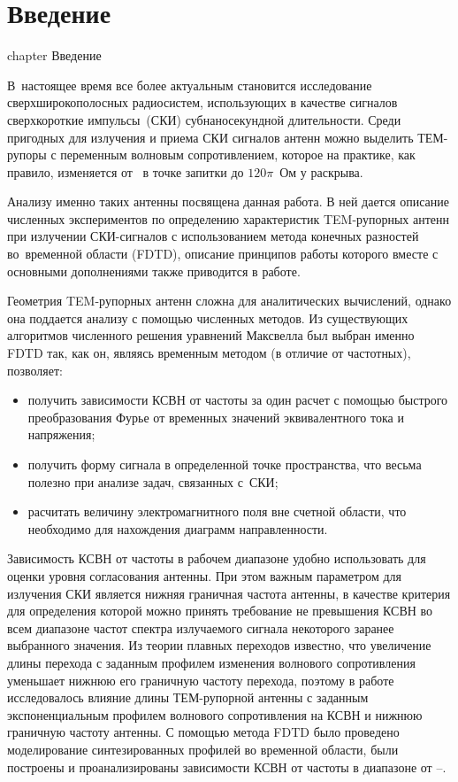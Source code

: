 %
%
%
\chapter* {Введение}
 {chapter} {Введение}

В~настоящее время все более актуальным становится исследование
сверхширокополосных радиосистем, использующих в качестве сигналов сверхкороткие
импульсы~(СКИ) субнаносекундной длительности. Среди пригодных для излучения
и приема СКИ сигналов антенн можно выделить ТЕМ-рупоры с переменным волновым
сопротивлением, которое на практике, как правило, изменяется от~
в точке запитки до $120\pi$~Ом у раскрыва.

Анализу именно таких антенны посвящена данная работа. В ней дается описание
численных экспериментов по определению характеристик TEM-рупорных
антенн при излучении СКИ-сигналов с использованием метода конечных разностей
во~временной области (FDTD), описание принципов работы которого вместе
с основными дополнениями также приводится в работе.

Геометрия TEM-рупорных антенн сложна для аналитических вычислений, однако она
поддается анализу с помощью численных методов. Из существующих алгоритмов
численного решения уравнений Максвелла был выбран именно FDTD так, как он,
являясь временным методом (в отличие от частотных), позволяет:
\begin{itemize}
\item получить зависимости КСВН от частоты за один расчет с помощью быстрого
      преобразования Фурье от временных значений эквивалентного тока
      и напряжения;
\item получить форму сигнала в определенной точке пространства, что весьма
      полезно при анализе задач, связанных с~СКИ;
\item расчитать величину электромагнитного поля вне счетной области, что необходимо
      для нахождения диаграмм направленности.
\end{itemize}

Зависимость КСВН от частоты в рабочем диапазоне удобно использовать для оценки
уровня согласования антенны. При этом важным параметром для излучения СКИ
является нижняя граничная частота антенны, в качестве критерия для определения
которой можно принять требование не превышения КСВН во всем диапазоне частот
спектра излучаемого сигнала некоторого заранее выбранного значения.
Из теории плавных переходов известно, что
увеличение длины перехода с заданным профилем изменения волнового сопротивления
уменьшает нижнюю его граничную частоту перехода, поэтому в работе исследовалось
влияние длины ТЕМ-рупорной антенны с заданным экспоненциальным профилем
волнового сопротивления на КСВН и нижнюю граничную частоту антенны. С помощью
метода FDTD было проведено моделирование синтезированных профилей во временной
области, были построены и проанализированы зависимости КСВН от частоты
в диапазоне от --.

